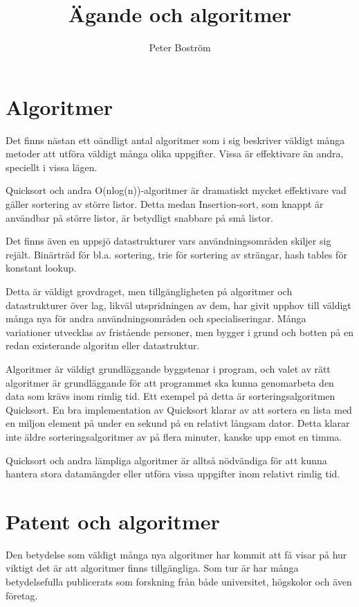 \documentclass{article}
\title{Ägande och algoritmer}
\author{Peter Boström}
\begin{document}
\maketitle
\vspace{24mm}

\section*{Algoritmer}

Det finns nästan ett oändligt antal algoritmer som i sig beskriver väldigt många metoder att utföra väldigt många olika uppgifter. Vissa är effektivare än andra, speciellt i vissa lägen. 

Quicksort och andra O(nlog(n))-algoritmer är dramatiskt mycket effektivare vad gäller sortering av större listor. Detta medan Insertion-sort, som knappt är användbar på större listor, är betydligt snabbare på små listor. 

Det finns även en uppsjö datastrukturer vars användningsområden skiljer sig rejält. Binärträd för bl.a. sortering, trie för sortering av strängar, hash tables för konstant lookup.

Detta är väldigt grovdraget, men tillgängligheten på algoritmer och datastrukturer över lag, likväl utspridningen av dem, har givit upphov till väldigt många nya för andra användningsområden och specialiseringar. Många variationer utvecklas av fristående personer, men bygger i grund och botten på en redan existerande algoritm eller datastruktur.

Algoritmer är väldigt grundläggande byggstenar i program, och valet av rätt algoritmer är grundläggande för att programmet ska kunna genomarbeta den data som krävs inom rimlig tid. Ett exempel på detta är sorteringsalgoritmen Quicksort. En bra implementation av Quicksort klarar av att sortera en lista med en miljon element på under en sekund på en relativt långsam dator. Detta klarar inte äldre sorteringsalgoritmer av på flera minuter, kanske upp emot en timma.

Quicksort och andra lämpliga algoritmer är alltså nödvändiga för att kunna hantera stora datamängder eller utföra vissa uppgifter inom relativt rimlig tid.

\newpage

\section*{Patent och algoritmer}

Den betydelse som väldigt många nya algoritmer har kommit att få visar på hur viktigt det är att algoritmer finns tillgängliga. Som tur är har många betydelsefulla publicerats som forskning från både universitet, högskolor och även företag.
\end{document}
